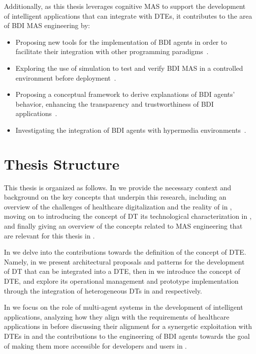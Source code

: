 Additionally, as this thesis leverages cognitive \ac{MAS} to support the development of intelligent applications that can integrate with \acp{DTE}, it contributes to the area of \ac{BDI} \ac{MAS} engineering by:  
\begin{itemize}
  \item Proposing new tools for the implementation of \ac{BDI} agents in order to facilitate their integration with other programming paradigms~\missingref{}.
  \item Exploring the use of simulation to test and verify \ac{BDI} \ac{MAS} in a controlled environment before deployment~\missingref{}.
  \item Proposing a conceptual framework to derive explanations of \ac{BDI} agents' behavior, enhancing the transparency and trustworthiness of \ac{BDI} applications~\missingref{}.
  \item Investigating the integration of \ac{BDI} agents with hypermedia environments~\missingref{}.
\end{itemize}


\section*{Thesis Structure}

This thesis is organized as follows. 
In  we provide the necessary context and background on the key concepts that underpin this research, including an overview of the challenges of healthcare digitalization and the reality of \ausl{} in , moving on to introducing the concept of \ac{DT} its technological characterization  in , and finally giving an overview of the concepts related to \ac{MAS} engineering that are relevant for this thesis in .

In  we delve into the contributions towards the definition of the concept of \ac{DTE}. Namely, in  we present architectural proposals and patterns for the development of \ac{DT} that can be integrated into a \ac{DTE}, then in  we introduce the concept of \ac{DTE}, and explore its operational management and prototype implementation through the integration of heterogeneous \acp{DT} in  and  respectively.

In  we focus on the role of multi-agent systems in the development of intelligent applications, analyzing how they align with the requirements of healthcare applications in  before discussing their alignment for a synergetic exploitation with \acp{DTE} in  and the contributions to the engineering of \ac{BDI} agents towards the goal of making them more accessible for developers and users in .

